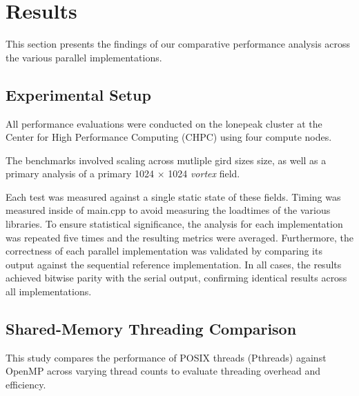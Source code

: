 \section{Results}

This section presents the findings of our comparative performance analysis across the various parallel implementations.


\subsection{Experimental Setup}

All performance evaluations were conducted on the lonepeak cluster at the Center for High Performance Computing (CHPC) using four compute nodes.


The benchmarks involved scaling across mutliple gird sizes size, as well as a primary analysis of a primary   1024 $\times$ 1024 \textit{vortex} field.

Each test was measured against a single static state of these fields.
Timing was measured inside of main.cpp to avoid measuring the loadtimes of the various libraries.
To ensure statistical significance, the analysis for each implementation was repeated five times and the resulting metrics were averaged.
Furthermore, the correctness of each parallel implementation was validated by comparing its output against the sequential reference implementation.
In all cases, the results achieved bitwise parity with the serial output, confirming identical results across all implementations.

\subsection{Shared-Memory Threading Comparison}

This study compares the performance of POSIX threads (Pthreads) against OpenMP across varying thread counts to evaluate threading overhead and efficiency.

